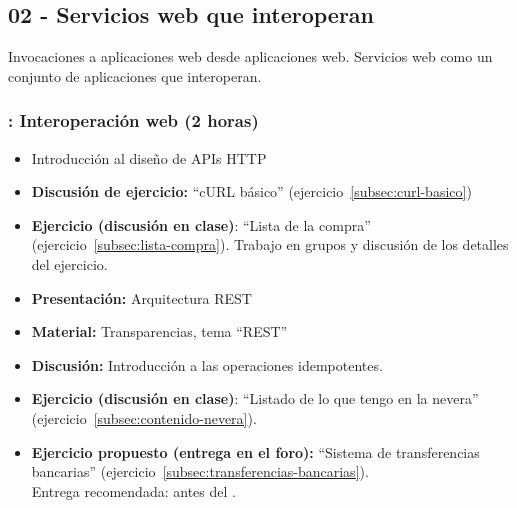 \documentclass[a4paper,12pt]{article}
\begin{document}
%
%

\subsection{02 - Servicios web que interoperan}

Invocaciones a aplicaciones web desde aplicaciones web. Servicios web como un conjunto de aplicaciones que interoperan.

\subsubsection{\martesF: Interoperación web (2 horas)}
\label{cal:martesF}

\begin{itemize}
\item Introducción al diseño de APIs HTTP
\item \textbf{Discusión de ejercicio:} ``cURL básico'' (ejercicio~\ref{subsec:curl-basico})
\item \textbf{Ejercicio (discusión en clase)}: ``Lista de la compra'' (ejercicio~\ref{subsec:lista-compra}).
  Trabajo en grupos y discusión de los detalles del ejercicio.
\item \textbf{Presentación:} Arquitectura REST
\item \textbf{Material:} Transparencias, tema ``REST''
\item \textbf{Discusión:} Introducción a las operaciones idempotentes.\item \textbf{Ejercicio (discusión en clase)}: ``Listado de lo que tengo en la nevera'' (ejercicio~\ref{subsec:contenido-nevera}).
\item \textbf{Ejercicio propuesto (entrega en el foro):} ``Sistema de transferencias bancarias'' (ejercicio~\ref{subsec:transferencias-bancarias}). \\
  Entrega recomendada: antes del \martesG.
\end{itemize}
\end{document}
